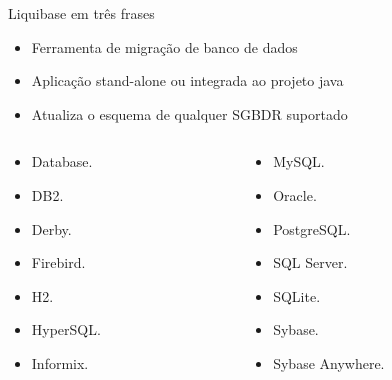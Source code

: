 \begin{frame}[c]

\begin{block}{Liquibase em três frases}
    \begin{itemize}
        \item Ferramenta de migração de banco de dados
        \item Aplicação stand-alone ou integrada ao projeto java
        \item Atualiza o esquema de qualquer SGBDR suportado
    \end{itemize}
\end{block}

   	\begin{columns}[t]
    \begin{column}[T]{5.5cm}
        \begin{itemize}
            \normalsize
            \item Database.
            \item DB2.	
            \item Derby.	
            \item Firebird.	
            \item H2.	
            \item  HyperSQL.
            \item  Informix.
        \end{itemize}
    \end{column}
    
    \begin{column}[T]{5.5cm}
        \begin{itemize}
             \normalsize
           \item MySQL.
           \item \textcolor{turtlegreen}{Oracle}.
           \item  \textcolor{turtlegreen}{PostgreSQL}.
           \item SQL Server.
           \item SQLite.
           \item Sybase.
           \item Sybase Anywhere.
       \end{itemize}
    \end{column}
\end{columns}

\end{frame}

